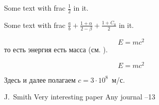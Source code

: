 \documentclass{article}
\begin{document}
Some text with frac $\frac{1}{2}$ in it.%

Some text with frac $\frac{a}{b}+\frac{1+\alpha}{2-\beta}+\frac{1+C_0}{2}$ in it.  %



\begin{equation}\label{eq1}
E=mc^2
\end{equation}
то есть энергия есть масса (см. \cite{Einstein}).

$$E=mc^2$$

Здесь и далее полагаем $c=3\cdot10^8$~м/с.

\begin{thebibliography}{99}


\by J.~Smith
\paper Very interesting paper
\jour Any journal
--13


\end{thebibliography}
\end{document}
